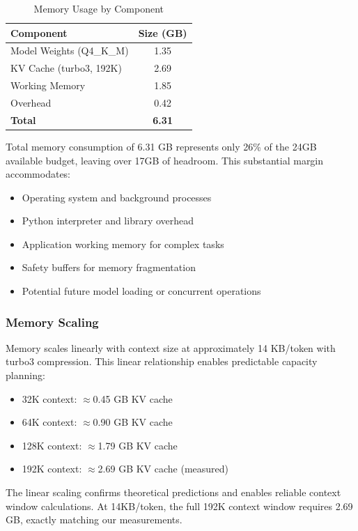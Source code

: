 \begin{table}[h]
\centering
\caption{Memory Usage by Component}
\label{tab:memory_results}
\begin{tabular}{lc}
\toprule
\textbf{Component} & \textbf{Size (GB)} \\
\midrule
Model Weights (Q4\_K\_M) & 1.35 \\
KV Cache (turbo3, 192K) & 2.69 \\
Working Memory & 1.85 \\
Overhead & 0.42 \\
\midrule
\textbf{Total} & \textbf{6.31} \\
\bottomrule
\end{tabular}
\end{table}

Total memory consumption of 6.31 GB represents only 26\% of the 24GB available budget, leaving over 17GB of headroom. This substantial margin accommodates:
\begin{itemize}
    \item Operating system and background processes
    \item Python interpreter and library overhead
    \item Application working memory for complex tasks
    \item Safety buffers for memory fragmentation
    \item Potential future model loading or concurrent operations
\end{itemize}

\subsubsection{Memory Scaling}

Memory scales linearly with context size at approximately 14 KB/token with turbo3 compression. This linear relationship enables predictable capacity planning:

\begin{itemize}
    \item 32K context: $\approx$0.45 GB KV cache
    \item 64K context: $\approx$0.90 GB KV cache
    \item 128K context: $\approx$1.79 GB KV cache
    \item 192K context: $\approx$2.69 GB KV cache (measured)
\end{itemize}

The linear scaling confirms theoretical predictions and enables reliable context window calculations. At 14KB/token, the full 192K context window requires 2.69 GB, exactly matching our measurements.

